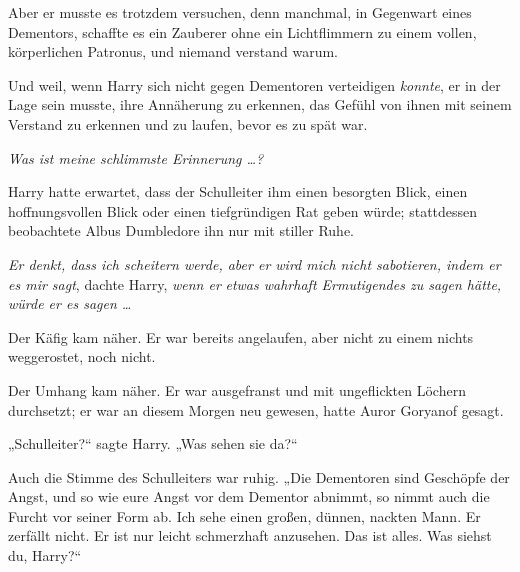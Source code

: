 Aber er musste es trotzdem versuchen, denn manchmal, in Gegenwart eines Dementors, schaffte es ein Zauberer ohne ein Lichtflimmern zu einem vollen, körperlichen Patronus, und niemand verstand warum.

Und weil, wenn Harry sich nicht gegen Dementoren verteidigen \emph{konnte}, er in der Lage sein musste, ihre Annäherung zu erkennen, das Gefühl von ihnen mit seinem Verstand zu erkennen und zu laufen, bevor es zu spät war.

\emph{Was ist meine schlimmste Erinnerung …?}

Harry hatte erwartet, dass der Schulleiter ihm einen besorgten Blick, einen hoffnungsvollen Blick oder einen tiefgründigen Rat geben würde; stattdessen beobachtete Albus Dumbledore ihn nur mit stiller Ruhe.

\emph{Er denkt, dass ich scheitern werde, aber er wird mich nicht sabotieren, indem er es mir sagt}, dachte Harry, \emph{wenn er} \emph{etwas wahrhaft Ermutigendes zu sagen hätte, würde er es sagen …}

Der Käfig kam näher. Er war bereits angelaufen, aber nicht zu einem nichts weggerostet, noch nicht.

Der Umhang kam näher. Er war ausgefranst und mit ungeflickten Löchern durchsetzt; er war an diesem Morgen neu gewesen, hatte Auror Goryanof gesagt.

„Schulleiter?“ sagte Harry.
„Was sehen sie da?“

Auch die Stimme des Schulleiters war ruhig.
„Die Dementoren sind Geschöpfe der Angst, und so wie eure Angst vor dem Dementor abnimmt, so nimmt auch die Furcht vor seiner Form ab. Ich sehe einen großen, dünnen, nackten Mann. Er zerfällt nicht. Er ist nur leicht schmerzhaft anzusehen. Das ist alles. Was siehst du, Harry?“

